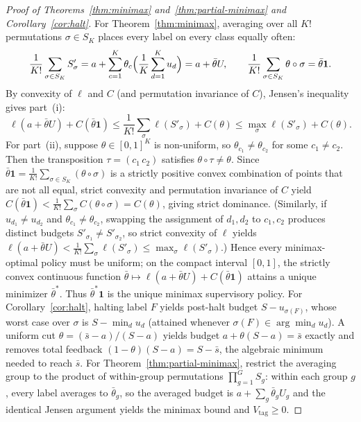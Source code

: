 \documentclass[11pt,letterpaper]{article}
\theoremstyle{definition}
\begin{document}
\begin{proof}[Proof of Theorems~\ref{thm:minimax} and~\ref{thm:partial-minimax} and Corollary~\ref{cor:halt}]
For Theorem~\ref{thm:minimax}, averaging over all $K!$ permutations $\sigma \in S_K$ places every label on every class equally often:
\[
  \frac{1}{K!} \sum_{\sigma \in S_K} S'_\sigma = a + \sum_{c=1}^K \theta_c \Bigl(\frac{1}{K} \sum_{d=1}^K u_d\Bigr) = a + \bar{\theta} U,
  \qquad
  \frac{1}{K!} \sum_{\sigma \in S_K} \theta \circ \sigma = \bar{\theta}\mathbf{1}.
\]
By convexity of $\ell$ and $C$ (and permutation invariance of $C$), Jensen's inequality gives part~(i):
\[
  \ell(a + \bar{\theta} U) + C(\bar{\theta}\mathbf{1})
  \le \frac{1}{K!} \sum_{\sigma} \ell(S'_\sigma) + C(\theta)
  \le \max_{\sigma} \ell(S'_\sigma) + C(\theta).
\]
For part~(ii), suppose $\theta \in [0, 1]^K$ is non-uniform, so $\theta_{c_1} \neq \theta_{c_2}$ for some $c_1 \neq c_2$. Then the transposition $\tau = (c_1\, c_2)$ satisfies $\theta \circ \tau \neq \theta$. Since $\bar{\theta}\mathbf{1} = \frac{1}{K!}\sum_{\sigma \in S_K} (\theta \circ \sigma)$ is a strictly positive convex combination of points that are not all equal, strict convexity and permutation invariance of $C$ yield $C(\bar{\theta}\mathbf{1}) < \frac{1}{K!}\sum_\sigma C(\theta \circ \sigma) = C(\theta)$, giving strict dominance. (Similarly, if $u_{d_1} \neq u_{d_2}$ and $\theta_{c_1} \neq \theta_{c_2}$, swapping the assignment of $d_1, d_2$ to $c_1, c_2$ produces distinct budgets $S'_{\sigma_1} \neq S'_{\sigma_2}$, so strict convexity of $\ell$ yields $\ell(a + \bar{\theta} U) < \frac{1}{K!}\sum_\sigma \ell(S'_\sigma) \le \max_\sigma \ell(S'_\sigma)$.) Hence every minimax-optimal policy must be uniform; on the compact interval $[0, 1]$, the strictly convex continuous function $\bar{\theta} \mapsto \ell(a + \bar{\theta} U) + C(\bar{\theta}\mathbf{1})$ attains a unique minimizer $\bar{\theta}^*$. Thus $\bar{\theta}^*\mathbf{1}$ is the unique minimax supervisory policy.
For Corollary~\ref{cor:halt}, halting label $F$ yields post-halt budget $S - u_{\sigma(F)}$, whose worst case over $\sigma$ is $S - \min_d u_d$ (attained whenever $\sigma(F) \in \arg\min_d u_d$). A uniform cut $\theta = (\bar{s} - a)/(S - a)$ yields budget $a + \theta(S - a) = \bar{s}$ exactly and removes total feedback $(1 - \theta)(S - a) = S - \bar{s}$, the algebraic minimum needed to reach $\bar{s}$. For Theorem~\ref{thm:partial-minimax}, restrict the averaging group to the product of within-group permutations $\prod_{g=1}^G S_g$: within each group $g$, every label averages to $\bar{\theta}_g$, so the averaged budget is $a + \sum_g \bar{\theta}_g U_g$ and the identical Jensen argument yields the minimax bound and $V_{\mathrm{tag}} \ge 0$.
\end{proof}
\end{document}
